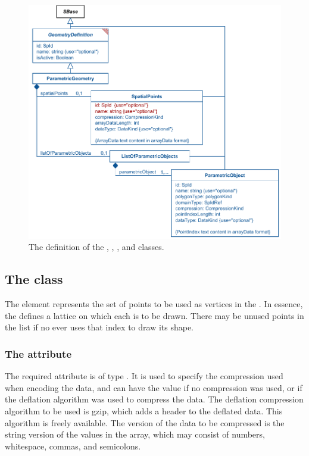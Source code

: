 \begin{figure}[ht]
  \includegraphics{figs/ParametricGeometry-uml}
  \caption{The definition of the \ParametricGeometry, \SpatialPoints, \ListOfParametricObjects, and \ParametricObject classes.}
  \label{ParametricGeometry-uml}
  \label{SpatialPoints-uml}
  \label{ListOfParametricObjects-uml}
  \label{ParametricObject-uml}
  \label{PolygonObject-uml}
\end{figure}


\subsection{The  class}
\label{spatialpoints-class}
The \SpatialPoints element represents the set of points to be used as vertices in the \ParametricGeometry.  In essence, the \SpatialPoints defines a lattice on which each \ParametricObject is to be drawn.  There may be unused points in the list if no \ParametricObject ever uses that index to draw its shape.

\subsubsection{The \fixttspace{} attribute}
The required  attribute is of type . It is used to specify the compression used when encoding the data, and can have the value  if no compression was used, or  if the deflation algorithm was used to compress the data. The deflation compression algorithm to be used is gzip, which adds a header to the deflated data.  This algorithm is freely available.  The version of the data to be compressed is the string version of the values in the array, which may consist of numbers, whitespace, commas, and semicolons.

